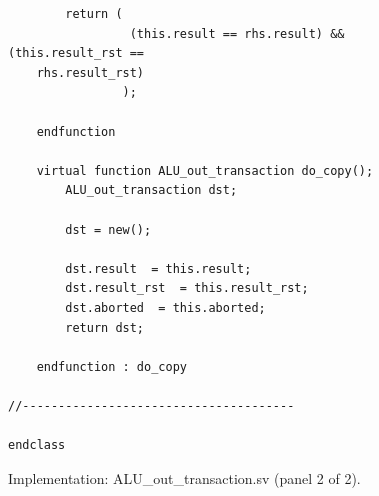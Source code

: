 \documentclass[11pt,a4paper]{article}
\begin{document}
\begin{figure}[!htbp]\begin{minipage}{\linewidth}\fontsize{10}{11.4}\selectfont\begin{verbatim}
        return (
                 (this.result == rhs.result) && (this.result_rst == 
    rhs.result_rst)
                );

    endfunction

    virtual function ALU_out_transaction do_copy();
        ALU_out_transaction dst;

        dst = new();
        
        dst.result  = this.result;
        dst.result_rst  = this.result_rst;
        dst.aborted  = this.aborted;
        return dst;

    endfunction : do_copy

//--------------------------------------

endclass
\end{verbatim}\end{minipage}\caption{Implementation: ALU\_out\_transaction.sv (panel 2 of 2).}\end{figure}
\clearpage
\end{document}
